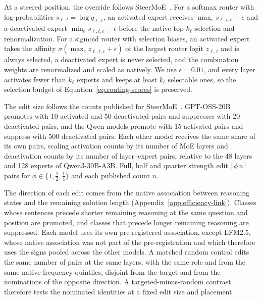 At a steered position, the override follows SteerMoE~\citep{fayyaz2025steermoe}.
%
For a softmax router with log-probabilities $s_{\ell,t}=\log q_{\ell,t}$, an activated expert receives $\max_e s_{\ell,t,e}+\epsilon$ and a deactivated expert $\min_e s_{\ell,t,e}-\epsilon$ before the native top-$k_\ell$ selection and renormalization.
%
For a sigmoid router with selection biases, an activated expert takes the affinity $\sigma(\max_e z_{\ell,t,e}+\epsilon)$ of the largest router logit $z_{\ell,t}$ and is always selected, a deactivated expert is never selected, and the combination weights are renormalized and scaled as natively.
%
We use $\epsilon=0.01$, and every layer activates fewer than $k_\ell$ experts and keeps at least $k_\ell$ selectable ones, so the selection budget of Equation~\eqref{eq:routing-scores} is preserved.
%

The edit size follows the counts published for SteerMoE~\citep{fayyaz2025steermoe}.
%
GPT-OSS-20B promotes with 10 activated and 50 deactivated pairs and suppresses with 20 deactivated pairs, and the Qwen models promote with 15 activated pairs and suppress with 500 deactivated pairs.
%
Each other model receives the same share of its own pairs, scaling activation counts by its number of MoE layers and deactivation counts by its number of layer--expert pairs, relative to the 48 layers and 128 experts of Qwen3-30B-A3B.
%
Full, half and quarter strength edit $\lceil \phi\,n\rceil$ pairs for $\phi\in\{1,\tfrac12,\tfrac14\}$ and each published count $n$.
%

The direction of each edit comes from the native association between reasoning states and the remaining solution length (Appendix~\ref{app:efficiency-link}).
%
Classes whose sentences precede shorter remaining reasoning at the same question and position are promoted, and classes that precede longer remaining reasoning are suppressed.
%
Each model uses its own pre-registered association, except LFM2.5, whose native association was not part of the pre-registration and which therefore uses the signs pooled across the other models.
%
A matched random control edits the same number of pairs at the same layers, with the same role and from the same native-frequency quintiles, disjoint from the target and from the nominations of the opposite direction.
%
A targeted-minus-random contrast therefore tests the nominated identities at a fixed edit size and placement.
%

